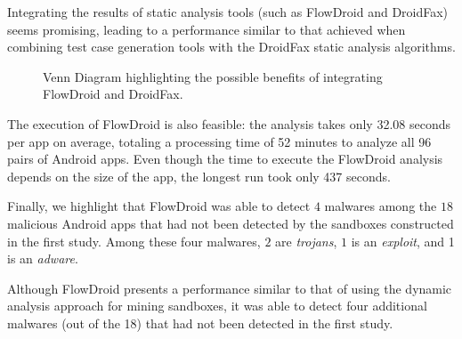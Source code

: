 \begin{finding}
  Integrating the results of static analysis tools
  (such as FlowDroid and DroidFax) seems promising,
  leading to a performance similar to that achieved
  when combining test case generation tools with the
  DroidFax static analysis algorithms. 
\end{finding}

\begin{figure}
  \caption{Venn Diagram highlighting the possible benefits of
    integrating FlowDroid and DroidFax.}
  \label{fig:venn-plot2}

\end{figure}

The execution of FlowDroid is also feasible: the analysis takes only
32.08 seconds per app on average, totaling a processing time of 52
minutes to analyze all 96 pairs of Android apps.
Even though the time to execute the FlowDroid analysis depends on the size
of the app, the longest run took only 437 seconds. 

Finally, we highlight that FlowDroid was able to detect $4$ malwares among the $18$ malicious Android apps that had not
been detected by the sandboxes constructed in the first study. Among these
four malwares, $2$ are \emph{trojans}, $1$ is an \emph{exploit}, and 1 is an \emph{adware}.

\begin{finding}
  Although FlowDroid presents a performance similar
  to that of using the dynamic analysis approach for mining sandboxes,
  it was able to detect four additional malwares (out of the
  18) that had not been detected in the first study. 
\end{finding}

